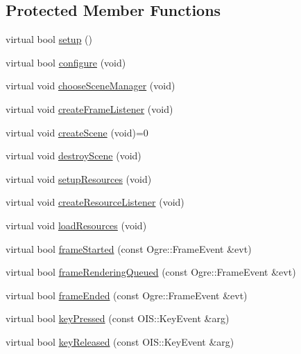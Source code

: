 \subsection*{\-Protected \-Member \-Functions}
\begin{DoxyCompactItemize}
\item 
virtual bool \hyperlink{classBaseApplication_ae548b5e3ac0cf92d4dc7d478a8f01922}{setup} ()
\item 
virtual bool \hyperlink{classBaseApplication_a7882a8f2e08e8d6cde00e8c29b2153b0}{configure} (void)
\item 
virtual void \hyperlink{classBaseApplication_a0cf5e311b1c7426590ad6831e4c5352a}{choose\-Scene\-Manager} (void)
\item 
virtual void \hyperlink{classBaseApplication_ab672d2b969b8530ee753f8b000d219c6}{create\-Frame\-Listener} (void)
\item 
virtual void \hyperlink{classBaseApplication_aa97beeb4059b17d0ec22eae33286ec2d}{create\-Scene} (void)=0
\item 
virtual void \hyperlink{classBaseApplication_ab61c91a38b99f98ff369ce8098a91133}{destroy\-Scene} (void)
\item 
virtual void \hyperlink{classBaseApplication_aa71428aeca821504352f5f795e6a9226}{setup\-Resources} (void)
\item 
virtual void \hyperlink{classBaseApplication_a9e916d51e4d73e355091d0662c175d85}{create\-Resource\-Listener} (void)
\item 
virtual void \hyperlink{classBaseApplication_a7d72de4f9e3d17ce0a4a034d780baf67}{load\-Resources} (void)
\item 
virtual bool \hyperlink{classBaseApplication_af6c816b6ea18980a887d9fc92179f33b}{frame\-Started} (const \-Ogre\-::\-Frame\-Event \&evt)
\item 
virtual bool \hyperlink{classBaseApplication_adea8d433b93b66ec7ab48b7e244661df}{frame\-Rendering\-Queued} (const \-Ogre\-::\-Frame\-Event \&evt)
\item 
virtual bool \hyperlink{classBaseApplication_a0f1c9d085cafd1ead25cc8a85e944864}{frame\-Ended} (const \-Ogre\-::\-Frame\-Event \&evt)
\item 
virtual bool \hyperlink{classBaseApplication_ad79efa8c9d6f0f6a3cf8a34c25a1bd5f}{key\-Pressed} (const \-O\-I\-S\-::\-Key\-Event \&arg)
\item 
virtual bool \hyperlink{classBaseApplication_a72dbb7e590af8f96904bc55eb1875a56}{key\-Released} (const \-O\-I\-S\-::\-Key\-Event \&arg)
\item 

\end{DoxyCompactItemize}
